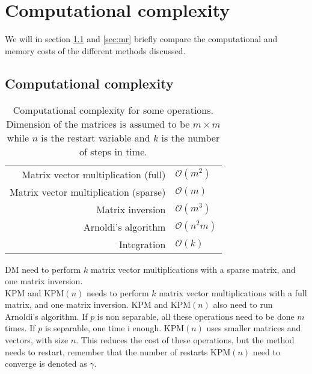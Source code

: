 \chapter{Computational complexity}%
\label{sec:comp}
We will in section \ref{sec:cc} and \ref{sec:mr} briefly compare the computational and memory costs of the different methods discussed.%
\section{Computational complexity} \label{sec:cc}
\begin{table}[H]
\centering
\begin{tabular}{r | l}
 Matrix vector multiplication (full) & $\mathcal{O}(m^2)$ \cite{complex} \\
 Matrix vector multiplication (sparse) & $\mathcal{O}(m)$ \cite{complex} \\
 Matrix inversion  & $ \mathcal{O}(m^3)$ \cite{complex} \\
 Arnoldi's algorithm & $ \mathcal{O}(n^2 m)$ \cite{saad} \\
 Integration & $\mathcal{O}(k)$
\end{tabular}
\caption{Computational complexity for some operations. Dimension of the matrices is assumed to be $m \times m$ while $n$ is the restart variable and $k$ is the number of steps in time.}
\label{tab:runtime}
\end{table}
DM need to perform $k$ matrix vector multiplications with a sparse matrix, and one matrix inversion. \\

KPM and KPM$(n)$ needs to perform $k$ matrix vector multiplications with a full matrix, and one matrix inversion. KPM and KPM$(n)$ also need to run Arnoldi's algorithm. If $p$ is non separable, all these operations need to be done $m$ times. If $p$ is separable, one time i enough. KPM$(n)$ uses smaller matrices and vectors, with size $n$. This reduces the cost of these operations, but the method needs to restart, remember that the number of restarts KPM$(n)$ need to converge is denoted as  $\gamma$.\\ %

